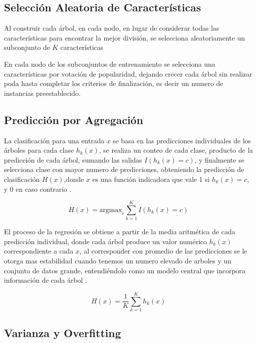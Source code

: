 		\subsection{Selección Aleatoria de Características}
			
			Al construir cada árbol, en cada nodo, en lugar de considerar todas las características para encontrar la mejor división, se selecciona aleatoriamente un subconjunto de $K$ características
			
			En cada nodo de los subconjuntos de entrenamiento se selecciona una características por votación de popularidad, dejando crecer cada árbol sin realizar poda hasta completar los criterios de finalización, es decir un numero de instancias preestablecido\citep{breiman2001}.
			
		\subsection{Predicción por Agregación}
		
			 La clasificación para una entrada $x$ se basa en las predicciones individuales de los árboles para cada clase $h_{k}(x)$, se realiza un conteo de cada clase, producto de la predicción de cada árbol, sumando las salidas $I(h_{k}(x)=c)$, y finalmente se selecciona clase con mayor numero de predicciones, obteniendo la predicción de clasificación $H(x)$,donde $x$ es una función indicadora que vale 1 si $h_{k}(x)=c$, y $0$ en caso contrario \citep{breiman2001}.
			 
			 \begin{equation}
			 	H(x) = \text{argmax}_c \sum_{k=1}^K I(h_k(x) = c)
			 \end{equation}


			El proceso de la regresión se obtiene a partir de la media aritmética de cada predicción individual, donde cada árbol produce un valor numérico $h_{k}(x)$ correspondiente a cada $x$, al corresponder con promedio de las predicciones se le otorga mas estabilidad cuando tenemos un numero elevado de arboles  y un conjunto de datos grande, entendiéndolo como un modelo central que incorpora información de cada árbol \citep{breiman2001}. 
			
			\begin{equation}
					H(x) = \frac{1}{K} \sum_{k=1}^K h_k(x)	
			\end{equation}

		\subsection{Varianza y Overfitting}
		
